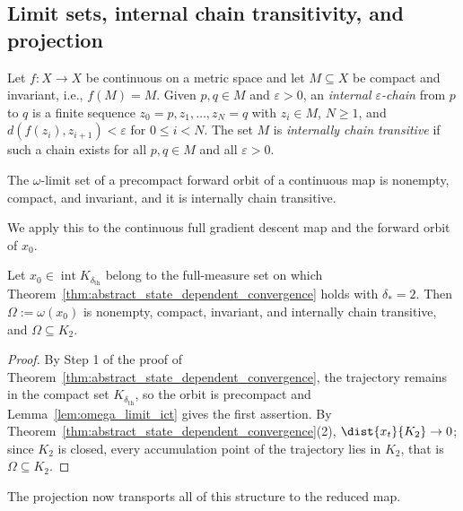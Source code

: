 \documentclass{article}
\begin{document}
\subsection{Limit sets, internal chain transitivity, and projection}
\label{subsec:ict_pushdown}

\begin{definition}
\label{def:ict}
Let $f\colon X\to X$ be continuous on a metric space and let $M\subseteq X$ be
compact and invariant, i.e., $f(M)=M$. Given $p,q\in M$ and $\varepsilon>0$, an
\emph{internal $\varepsilon$-chain} from $p$ to $q$ is a finite sequence
$z_0=p,z_1,\dots,z_N=q$ with $z_i\in M$, $N\ge1$, and
$d(f(z_i),z_{i+1})<\varepsilon$ for $0\le i<N$. The set $M$ is
\emph{internally chain transitive} if such a chain exists for all $p,q\in M$
and all $\varepsilon>0$.
\end{definition}


\begin{lemma}
\label{lem:omega_limit_ict}
The $\omega$-limit set of a precompact forward orbit of a continuous map is
nonempty, compact, and invariant, and it is internally chain transitive.
\end{lemma}

We apply this to the continuous full gradient descent map and the forward orbit
of $x_0$.

\begin{lemma}
\label{lem:omega_in_K2}
Let $x_0\in\operatorname{int}K_{\delta_{\mathrm{th}}}$ belong to the
full-measure set on which
Theorem~\ref{thm:abstract_state_dependent_convergence} holds with
$\delta_\ast=2$. Then $\Omega:=\omega(x_0)$ is nonempty, compact, invariant,
and internally chain transitive, and $\Omega\subseteq K_2$.
\end{lemma}

\begin{proof}
By Step 1 of the proof of
Theorem~\ref{thm:abstract_state_dependent_convergence}, the trajectory remains
in the compact set $K_{\delta_{\mathrm{th}}}$, so the orbit is precompact and
Lemma~\ref{lem:omega_limit_ict} gives the first assertion. By
Theorem~\ref{thm:abstract_state_dependent_convergence}(2),
$\dist{x_t}{K_2}\to0$; since $K_2$ is closed, every accumulation point of the
trajectory lies in $K_2$, that is $\Omega\subseteq K_2$.
\end{proof}

The projection now transports all of this structure to the reduced map.
\end{document}
